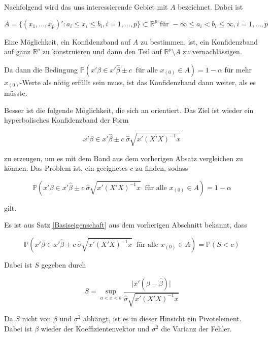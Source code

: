 \documentclass[12pt,a4paper]{article}
\theoremstyle{definition}
\theoremstyle{definition}
\theoremstyle{definition}
\theoremstyle{definition}
\begin{document}
Nachfolgend wird das uns interessierende Gebiet mit $A$ bezeichnet. Dabei ist 

\begin{equation*}
A = \{(x_1, \ldots, x_p)' : a_i \leq x_i \leq b_i, i = 1, \ldots, p \} \subset \mathbb{R}^p \text{ für } - \infty \leq a_i < b_i \leq \infty, i=1, \ldots, p
\end{equation*}

Eine Möglichkeit, ein Konfidenzband auf $A$ zu bestimmen, ist, ein Konfidenzband auf ganz $\mathbb{R}^p$ zu konstruieren und dann den Teil auf $\mathbb{R}^{p} \setminus A$ zu vernachlässigen.

Da dann die Bedingung $\mathbb{P}(x'\beta \in x' \hat{\beta} \pm c ~ \text{ für alle } x_{(0)} \in A) = 1-\alpha$ für mehr $x_{(0)}$-Werte als nötig erfüllt sein muss, ist das Konfidenzband dann weiter, als es müsste.

Besser ist die folgende Möglichkeit, die sich an \cite[70]{Liu64} orientiert. Das Ziel ist wieder ein hyperbolisches Konfidenzband der Form 

\begin{equation}
x'\beta \in x' \hat{\beta} \pm c ~ \hat{\sigma} \sqrt{x' (X'X)^{-1}x} \label{hyperbolisches_KB}
\end{equation}

zu erzeugen, um es mit dem Band aus dem vorherigen Absatz vergleichen zu können. Das Problem ist, ein geeignetes $c$ zu finden, sodass 

\begin{equation*}
\mathbb{P}( x'\beta \in x' \hat{\beta} \pm c ~ \hat{\sigma} \sqrt{x' (X'X)^{-1}x} ~ \text{ für alle } x_{(0)} \in A) = 1-\alpha
\end{equation*}
 
gilt.

Es ist aus Satz \ref{Basiseigenschaft} aus dem vorherigen Abschnitt bekannt, dass 

\begin{equation*}
\mathbb{P}( x'\beta \in x' \hat{\beta} \pm c ~ \hat{\sigma} \sqrt{x' (X'X)^{-1}x} ~ \text{ für alle } x_{(0)} \in A ) = \mathbb{P}(S<c)
\end{equation*}

Dabei ist $S$ gegeben durch 

\begin{equation*}
S = \sup_{a<x<b} \frac{\vert x'(\beta - \hat{\beta}) \vert}{\hat{\sigma} \sqrt{x'(X'X)^{-1}x}}
\end{equation*}

Da $S$ nicht von $\beta$ und $\sigma^2$ abhängt, ist es in dieser Hinsicht ein Pivotelement. Dabei ist $\beta$ wieder der Koeffizientenvektor und $\sigma^2$ die Varianz der Fehler. 
\end{document}
